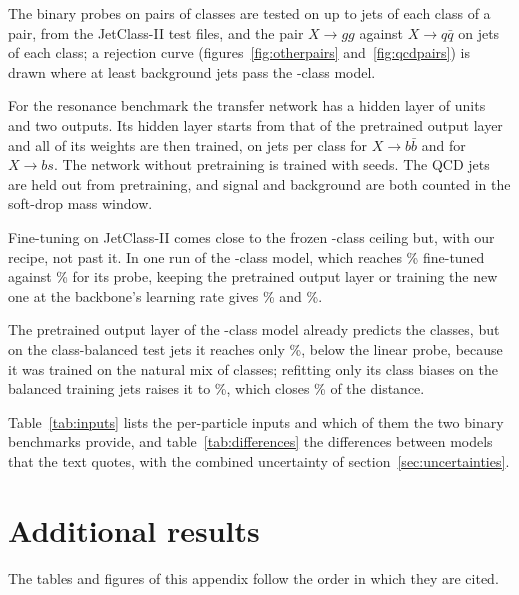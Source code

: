 The binary probes on pairs of classes are tested on up to \JcBalPairTestPerSide{} jets of each class of a pair,
from the JetClass-II test files, and the pair $X\to gg$ against $X\to q\bar q$ on \VGgTestPerClass{} jets of each
class; a rejection curve (figures~\ref{fig:otherpairs} and~\ref{fig:qcdpairs}) is drawn where at least
\MlstMinBkgPass{} background jets pass the \Kfull-class model.

For the resonance benchmark the transfer network has a hidden layer of \DesignHeadHidden{} units and two outputs.
Its hidden layer starts from that of the pretrained output layer and all of its weights are then trained, on
\XbbNTrainPerClass{} jets per class for $X\to b\bar b$ and \XbsNTrainPerClass{} for $X\to bs$.
The network without pretraining is trained with \MlstXbxScratchSeedsWord{} seeds.
The QCD jets are held out from pretraining, and signal and background are both counted in the soft-drop mass
window.

Fine-tuning on JetClass-II comes close to the frozen \Kfull-class ceiling but, with our recipe, not past it.
In one run of the \Kfull-class model, which reaches \VCsFtOneAcc\% fine-tuned against \VCsLpOneAcc\% for its probe,
keeping the pretrained output layer or training the new one at the backbone's learning rate gives \VCsHeadKeptAcc\%
and \VCsHeadRateAcc\%.

The pretrained output layer of the \Kfull-class model already predicts the \Kfull{} classes, but on the
class-balanced test jets it reaches only \VHeadAcc\%, below the linear probe, because it was trained on the natural
mix of classes; refitting only its class biases on the balanced training jets raises it to \VHeadRefit\%, which
closes \VHeadClosed\% of the distance.

Table~\ref{tab:inputs} lists the per-particle inputs and which of them the two binary benchmarks provide, and
table~\ref{tab:differences} the differences between models that the text quotes, with the combined uncertainty of
section~\ref{sec:uncertainties}.




\section{Additional results}\label{app:results}
The tables and figures of this appendix follow the order in which they are cited.

